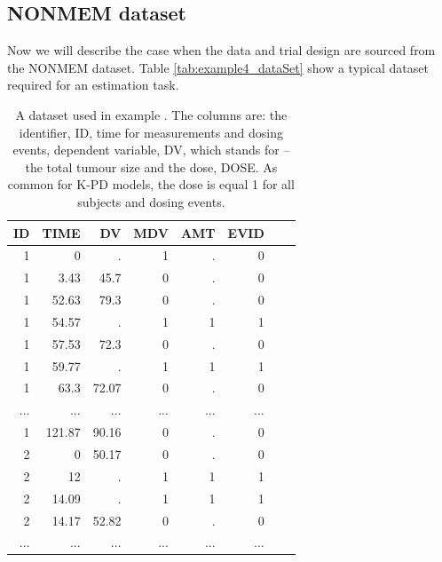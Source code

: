 \subsection{NONMEM dataset}
\label{sec:eg5-NONMEMdataset}
Now we will describe the case when the data and trial design are sourced from the 
NONMEM dataset. Table \ref{tab:example4_dataSet} show a typical dataset required for 
an estimation task.
\begin{table}[htdp]
\begin{center}
\small
\begin{tabular}{rrrrrrrr}\toprule
ID	& TIME	& DV		& MDV	& AMT	& EVID \\ \midrule
1	& 0		& .		&  1		& .		& 0 \\
1	& 3.43	& 45.7	&  0		& .		& 0 \\
1	& 52.63	& 79.3	&  0		& .		& 0 \\
1	& 54.57	& .		&  1		& 1		& 1 \\
1	& 57.53	& 72.3	&  0		& .		& 0 \\
1	& 59.77	& .		&  1		& 1		& 1 \\
1	& 63.3	& 72.07	&  0		& .		& 0 \\
...	& ...		& ...		& ...		& ...		& ...  \\
1	& 121.87	& 90.16	&  0		& .		& 0 \\
2	& 0		& 50.17	&  0		& .		& 0 \\
2	& 12		& .		&  1		& 1		& 1 \\
2	& 14.09	& .		&  1		& 1		& 1 \\
2	& 14.17	& 52.82	&  0		& .		& 0 \\
...	& ...		& ...		& ...		& ...		& ... \\ \bottomrule
\end{tabular}
\end{center}
\caption{A dataset used in example \theexamples.
The columns are: the identifier, ID, time for measurements and dosing events, 
dependent variable, DV, which stands for  -- the total tumour size and 
the dose, DOSE. As common for K-PD models, the dose is equal 1 for all subjects and 
dosing events. }
\label{tab:example5_dataSet}
\end{table}%



